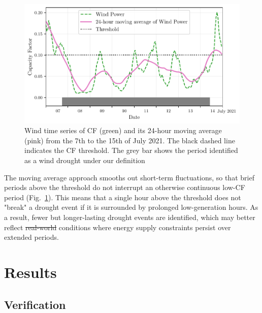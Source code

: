 \documentclass[preprint, 12pt]{elsarticle}
\providecommand{\DIFadd}[1]{{\protect\color{blue}\uwave{#1}}} %
\providecommand{\DIFdel}[1]{{\protect\color{red}\sout{#1}}}                      %
\providecommand{\DIFaddbegin}{} %
\providecommand{\DIFaddend}{} %
\providecommand{\DIFdelbegin}{} %
\providecommand{\DIFdelend}{} %
\begin{document}
\begin{figure}[ht!]
	\centering
	\includegraphics[width=\textwidth]{droughts_methodology.pdf}
	\caption{Wind time series of CF (green) and its 24-hour moving average (pink) from the 7th to the 15th of July 2021. The black dashed line indicates the CF threshold. The grey bar shows the period identified as a wind drought under our definition}
	\label{fig:find_res_droughts}
\end{figure}

The moving average approach smooths out short-term fluctuations, so that brief periods above the threshold do not interrupt an otherwise continuous low-CF period (Fig.~\ref{fig:find_res_droughts}). This means that a single hour above the threshold does not "break" a \DIFaddbegin \DIFadd{RES }\DIFaddend drought event if it is surrounded by prolonged low-generation hours. As a result, fewer but longer-lasting \DIFaddbegin \DIFadd{RES }\DIFaddend drought events are identified, which may better reflect \DIFdelbegin \DIFdel{real-world }\DIFdelend \DIFaddbegin \DIFadd{actual }\DIFaddend conditions where energy supply constraints persist over extended periods.

\section{Results}
\DIFdelbegin %
\DIFdelend \DIFaddbegin \label{sec:results}
\DIFaddend 

\subsection{Verification}
\label{sec:verification}
\end{document}
